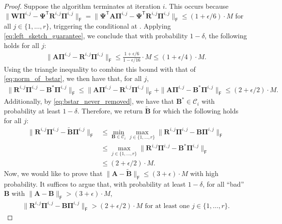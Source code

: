 \documentclass{article}[11pt]
\theoremstyle{definition}
\newcommand{\bv}[1]{\boldsymbol{\mathbf{#1}}}
\newcommand{\T}{\mathsf{T}}
\newcommand{\Fro}{\mathsf{F}}
\begin{document}
\begin{proof}
        Suppose the algorithm terminates at iteration $i$.
        This occurs because $\|\bv{W}\bv{\Pi}^{i,j} - \bv{\Psi}^\T\bv{R}^{i,j}\bv{\Pi}^{i,j}\|_\Fro = \|\bv{\Psi}^\T\bv{A}\bv{\Pi}^{i,j} - \bv{\Psi}^\T\bv{R}^{i,j}\bv{\Pi}^{i,j}\|_\Fro \leq (1+\epsilon/6)\cdot M$ for all $j\in \{1, \ldots, r\}$, triggering the conditional at .
         Applying \eqref{eq:left_sketch_guarantee}, we conclude that with probability $1-\delta$, the following holds for all $j$:
        \begin{align}
            \label{eq:error_of_r}
         \|\bv{A}\bv{\Pi}^{i,j} - \bv{R}^{i,j}\bv{\Pi}^{i,j}\|_\Fro \leq \frac{1+\epsilon/6}{1-\epsilon/16}\cdot M \leq (1+\epsilon/4)\cdot M.
        \end{align}
        Using the triangle inequality to combine this bound with that of \eqref{eq:norm_of_bstar}, we then have that, for all $j$,
        \begin{align}
        \|\bv{R}^{i,j}\bv{\Pi}^{i,j} - \bv{B}^*\bv{\Pi}^{i,j} \|_\Fro \leq  \|\bv{A}\bv{\Pi}^{i,j} - \bv{R}^{i,j}\bv{\Pi}^{i,j}\|_\Fro +  \|\bv{A}\bv{\Pi}^{i,j} - \bv{B}^*\bv{\Pi}^{i,j}\|_\Fro \leq (2+\epsilon/2)\cdot M.
        \end{align}
        Additionally, by \eqref{eq:bstar_never_removed}, we have that $\bv{B}^* \in \mathcal{C}_i$ with probability at least $1-\delta$.
        Therefore, we return $\bv{\tilde B}$ for which the following holds for all $j$:
        \begin{align}
        \|\bv{R}^{i,j}\bv{\Pi}^{i,j} - \bv{\tilde B}\bv{\Pi}^{i,j} \|_\Fro
        &\le \min_{\bv{B} \in \mathcal{C}_{i}}\max_{j\in \{1, \ldots, r\}} \|\bv{R}^{i,j}\bv{\Pi}^{i,j} - \bv{B}\bv{\Pi}^{i,j}\|_\Fro \nonumber \\
        &\leq \max_{j\in \{1, \ldots, r\}} \|\bv{R}^{i,j}\bv{\Pi}^{i,j} - \bv{B}^*\bv{\Pi}^{i,j}\|_\Fro \nonumber\\
        &\leq (2+\epsilon/2)\cdot M.\label{eq:upper bound on output}
        \end{align}
        Now, we would like to prove that $\|\bv{A} - \bv{\tilde B}\|_\Fro \le (3+\epsilon)\cdot M$ with high probability. It suffices to argue that, with probability at least $1-\delta$, for all ``bad'' $\bv B$ with $\|\bv{A} - \bv{B}\|_\Fro > (3+\epsilon)\cdot M$,
        \begin{align}
            \label{eq:bad_matrices_look_bad}
        \|\bv{R}^{i,j}\bv{\Pi}^{i,j} - \bv{B}\bv{\Pi}^{i,j} \|_\Fro > (2+\epsilon/2)\cdot M \text{ for at least one } j\in \{1, \ldots, r\}.

\end{align}
\end{proof}
\end{document}
